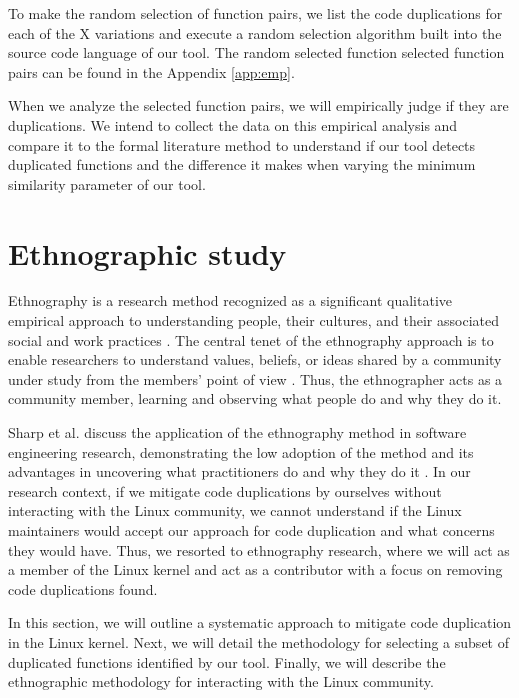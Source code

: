 To make the random selection of function pairs, we list the code duplications for each of the 
X variations and execute a random selection algorithm built into the source code language of 
our tool. The random selected function selected function pairs can 
be found in the Appendix \ref{app:emp}.

When we analyze the selected function pairs, we will empirically judge if they are duplications. 
We intend to collect the data on this empirical analysis and compare it to the formal literature 
method to understand if our tool detects duplicated functions and the difference it makes when 
varying the minimum similarity parameter of our tool.

\section{Ethnographic study}

\label{sec:meteth}

Ethnography is a research method recognized as a significant qualitative empirical approach to 
understanding people, their cultures, and their associated social and work practices \citep{bookethno}.
The central tenet of the ethnography approach is to enable researchers to understand values, 
beliefs, or ideas shared by a community under study from the members’ point of view 
\citep{ethnosoft}. Thus, the ethnographer acts as a community member, learning and observing 
what people do and why they do it.

Sharp et al. discuss the application of the ethnography method in software engineering research, 
demonstrating the low adoption of the method and its advantages in uncovering what practitioners 
do and why they do it \citep{ethnosoft}. In our research context, if we mitigate code 
duplications by ourselves without interacting with the Linux community, we cannot understand if 
the Linux maintainers would accept our approach for code duplication and what concerns they 
would have. Thus, we resorted to ethnography research, where we will act as a member of the 
Linux kernel and act as a contributor with a focus on removing code duplications found.

In this section, we will outline a systematic approach to mitigate code duplication in the 
Linux kernel. Next, we will detail the methodology for selecting a subset of duplicated functions 
identified by our tool. Finally, we will describe the ethnographic methodology for interacting 
with the Linux community.

